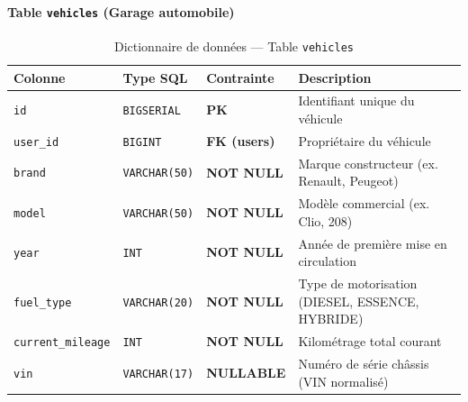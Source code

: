 \documentclass[12pt,a4paper,oneside]{report}
\begin{document}
\paragraph{Table \texttt{vehicles} (Garage automobile)}
\begin{table}[H]
\centering
\small
\begin{tabularx}{\textwidth}{p{3cm} p{2.5cm} p{2cm} X}
\toprule
\textbf{Colonne} & \textbf{Type SQL} & \textbf{Contrainte} & \textbf{Description} \\
\midrule
\texttt{id} & \texttt{BIGSERIAL} & \textbf{PK} & Identifiant unique du v\'ehicule \\
\texttt{user\_id} & \texttt{BIGINT} & \textbf{FK (users)} & Propri\'etaire du v\'ehicule \\
\texttt{brand} & \texttt{VARCHAR(50)} & \textbf{NOT NULL} & Marque constructeur (ex. Renault, Peugeot) \\
\texttt{model} & \texttt{VARCHAR(50)} & \textbf{NOT NULL} & Mod\`ele commercial (ex. Clio, 208) \\
\texttt{year} & \texttt{INT} & \textbf{NOT NULL} & Ann\'ee de premi\`ere mise en circulation \\
\texttt{fuel\_type} & \texttt{VARCHAR(20)} & \textbf{NOT NULL} & Type de motorisation (DIESEL, ESSENCE, HYBRIDE) \\
\texttt{current\_mileage} & \texttt{INT} & \textbf{NOT NULL} & Kilom\'etrage total courant \\
\texttt{vin} & \texttt{VARCHAR(17)} & \textbf{NULLABLE} & Num\'ero de s\'erie ch\^assis (VIN normalis\'e) \\
\bottomrule
\end{tabularx}
\caption{Dictionnaire de donn\'ees --- Table \texttt{vehicles}}
\end{table}
\end{document}
